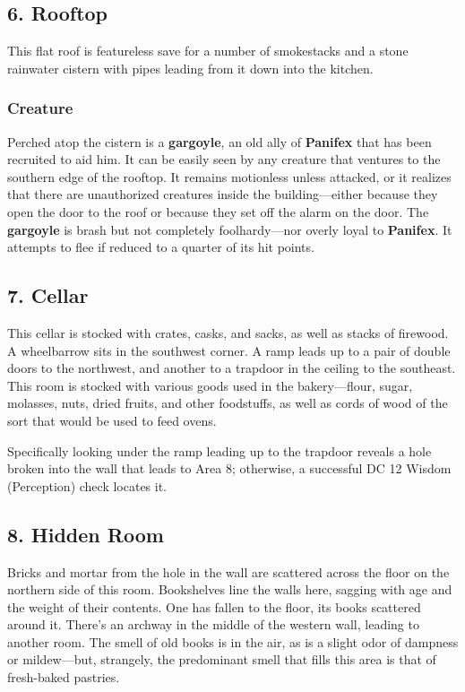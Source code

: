 \documentclass[10pt,a4paper,twoside,bg=print,twocolumn,openany,nodeprecatedcode]{dndbook}
\begin{document}
\subsection{6. Rooftop}
\begin{DndReadAloud}{}
This flat roof is featureless save for a number of smokestacks and a stone rainwater cistern with pipes leading from it down into the kitchen.

\end{DndReadAloud}

\subsubsection{Creature}
Perched atop the cistern is a \textbf{gargoyle}, an old ally of \textbf{Panifex} that has been recruited to aid him. It can be easily seen by any creature that ventures to the southern edge of the rooftop. It remains motionless unless attacked, or it realizes that there are unauthorized creatures inside the building—either because they open the door to the roof or because they set off the alarm on the door. The \textbf{gargoyle} is brash but not completely foolhardy—nor overly loyal to \textbf{Panifex}. It attempts to flee if reduced to a quarter of its hit points.

\subsection{7. Cellar}
\begin{DndReadAloud}{}
This cellar is stocked with crates, casks, and sacks, as well as stacks of firewood. A wheelbarrow sits in the southwest corner. A ramp leads up to a pair of double doors to the northwest, and another to a trapdoor in the ceiling to the southeast. This room is stocked with various goods used in the bakery—flour, sugar, molasses, nuts, dried fruits, and other foodstuffs, as well as cords of wood of the sort that would be used to feed ovens.

\end{DndReadAloud}

Specifically looking under the ramp leading up to the trapdoor reveals a hole broken into the wall that leads to Area 8; otherwise, a successful DC 12 Wisdom (Perception) check locates it.

\subsection{8. Hidden Room}
\begin{DndReadAloud}{}
Bricks and mortar from the hole in the wall are scattered across the floor on the northern side of this room. Bookshelves line the walls here, sagging with age and the weight of their contents. One has fallen to the floor, its books scattered around it. There's an archway in the middle of the western wall, leading to another room. The smell of old books is in the air, as is a slight odor of dampness or mildew—but, strangely, the predominant smell that fills this area is that of fresh-baked pastries.

\end{DndReadAloud}
\end{document}

